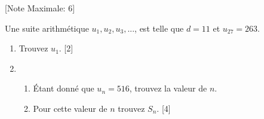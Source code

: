 \begin{question}
  \hspace*{\fill} [Note Maximale: 6]\par
  \noindent Une suite arithmétique $u_1, u_2, u_3, ...$, est telle que $d = 11$ et $u_27 =263$.\par
  \begin{enumerate}[label=(\alph*)]
    \item Trouvez $u_1$.\hspace*{\fill} [2]
    \item 
      \begin{enumerate}[label=(\roman*)]
        \item Étant donné que $u_n = 516$, trouvez la valeur de $n$.
        \item Pour cette valeur de $n$ trouvez $S_n$.\hspace*{\fill} [4]
      \end{enumerate}
  \end{enumerate}
\end{question}
